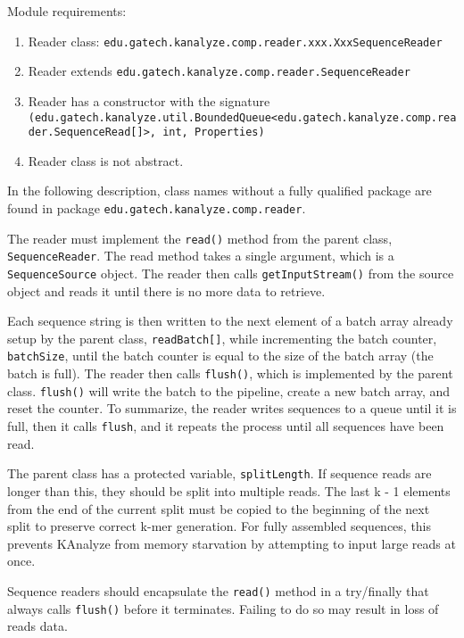 Module requirements:

\begin{enumerate}
  \item Reader class: \texttt{edu.gatech.kanalyze.comp.reader.xxx.XxxSequenceReader}\
  \item Reader extends \texttt{edu.gatech.kanalyze.comp.reader.SequenceReader}
  \item Reader has a constructor with the signature \texttt{(edu.gatech.kanalyze.util.BoundedQueue<edu.gatech.kanalyze.comp.reader.SequenceRead[]>, int, Properties)}
  \item Reader class is not abstract.
\end{enumerate}

In the following description, class names without a fully qualified package are found in package \texttt{edu.gatech.kanalyze.comp.reader}.

The reader must implement the \texttt{read()} method from the parent class, \texttt{SequenceReader}. The read method takes a single argument, which is a \texttt{SequenceSource} object. The reader then calls \texttt{getInputStream()} from the source object and reads it until there is no more data to retrieve.

Each sequence string is then written to the next element of a batch array already setup by the parent class, \texttt{readBatch[]}, while incrementing the batch counter, \texttt{batchSize}, until the batch counter is equal to the size of the batch array (the batch is full). The reader then calls \texttt{flush()}, which is implemented by the parent class. \texttt{flush()} will write the batch to the pipeline, create a new batch array, and reset the counter. To summarize, the reader writes sequences to a queue until it is full, then it calls \texttt{flush}, and it repeats the process until all sequences have been read.

The parent class has a protected variable, \texttt{splitLength}. If sequence reads are longer than this, they should be split into multiple reads. The last k - 1 elements from the end of the current split must be copied to the beginning of the next split to preserve correct k-mer generation. For fully assembled sequences, this prevents KAnalyze from memory starvation by attempting to input large reads at once.

Sequence readers should encapsulate the \texttt{read()} method in a try/finally that always calls \texttt{flush()} before it terminates. Failing to do so may result in loss of reads data.

